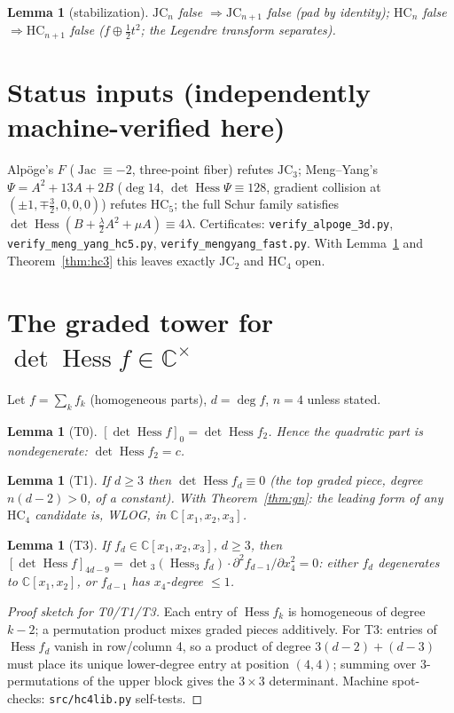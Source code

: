 \documentclass[11pt]{article}
\theoremstyle{plain}
\newtheorem{lemma}[theorem]{Lemma}
\theoremstyle{definition}
\newcommand{\C}{\mathbb{C}}
\newcommand{\Hess}{\operatorname{Hess}}
\newcommand{\Jac}{\operatorname{Jac}}
\newcommand{\JC}{\mathrm{JC}}
\newcommand{\HC}{\mathrm{HC}}
\begin{document}
\begin{lemma}[stabilization]\label{lem:stab}
$\JC_n$ false $\Rightarrow\JC_{n+1}$ false (pad by identity); $\HC_n$ false
$\Rightarrow\HC_{n+1}$ false ($f\oplus\tfrac12t^2$; the Legendre transform
separates).
\end{lemma}

\section{Status inputs (independently machine-verified here)}

Alp\"oge's $F$ ($\Jac\equiv-2$, three-point fiber) refutes $\JC_3$;
Meng--Yang's $\Psi=A^2+13A+2B$ ($\deg 14$, $\det\Hess\Psi\equiv128$,
gradient collision at $(\pm1,\mp\tfrac32,0,0,0)$) refutes $\HC_5$; the full
Schur family satisfies $\det\Hess(B+\tfrac\lambda2A^2+\mu A)\equiv4\lambda$.
Certificates: \texttt{verify\_alpoge\_3d.py},
\texttt{verify\_meng\_yang\_hc5.py}, \texttt{verify\_mengyang\_fast.py}.
With Lemma~\ref{lem:stab} and Theorem~\ref{thm:hc3} this leaves exactly
$\JC_2$ and $\HC_4$ open.

\section{The graded tower for $\det\Hess f\in\C^\times$}

Let $f=\sum_k f_k$ (homogeneous parts), $d=\deg f$, $n=4$ unless stated.

\begin{lemma}[T0]\label{lem:t0}
$[\det\Hess f]_0=\det\Hess f_2$. Hence the quadratic part is nondegenerate:
$\det\Hess f_2=c$.
\end{lemma}

\begin{lemma}[T1]\label{lem:t1}
If $d\ge3$ then $\det\Hess f_d\equiv0$ (the top graded piece, degree
$n(d-2)>0$, of a constant). With Theorem~\ref{thm:gn}: \emph{the leading
form of any $\HC_4$ candidate is, WLOG, in $\C[x_1,x_2,x_3]$.}
\end{lemma}

\begin{lemma}[T3]\label{lem:t3}
If $f_d\in\C[x_1,x_2,x_3]$, $d\ge3$, then
$[\det\Hess f]_{4d-9}=\det{}_3(\Hess_3f_d)\cdot\partial^2f_{d-1}/\partial
x_4^2=0$: either $f_d$ degenerates to $\C[x_1,x_2]$, or $f_{d-1}$ has
$x_4$-degree $\le1$.
\end{lemma}

\begin{proof}[Proof sketch for T0/T1/T3]
Each entry of $\Hess f_k$ is homogeneous of degree $k-2$; a permutation
product mixes graded pieces additively. For T3: entries of $\Hess f_d$
vanish in row/column 4, so a product of degree $3(d-2)+(d-3)$ must place
its unique lower-degree entry at position $(4,4)$; summing over
$3$-permutations of the upper block gives the $3\times3$ determinant.
Machine spot-checks: \texttt{src/hc4lib.py} self-tests.
\end{proof}
\end{document}
